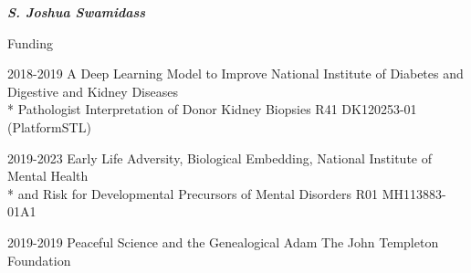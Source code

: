 \documentclass[10pt]{article}
\begin{document}
\begin{cv}{\huge \it \bfseries S. Joshua Swamidass}
\begin{cvlist}{Funding}
\item[2018-2019]  A Deep Learning Model to Improve  \hspace*{\fill}  National Institute of Diabetes and Digestive and Kidney Diseases \\*
Pathologist Interpretation of Donor Kidney Biopsies  \hspace*{\fill}  	R41	DK120253-01 (PlatformSTL)

\item[2019-2023]  Early Life Adversity, Biological Embedding, \hspace*{\fill} National Institute of Mental Health \\*  
   and Risk for Developmental Precursors of Mental Disorders    \hspace*{\fill}  R01 MH113883-01A1


\item[2019-2019]  Peaceful Science and the Genealogical Adam
    \hspace*{\fill} The John Templeton Foundation 



\end{cvlist}
\end{cv}
\end{document}
